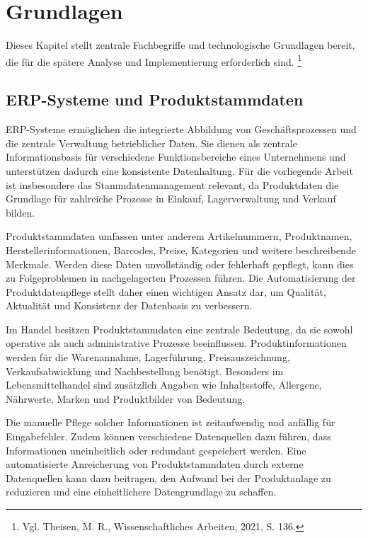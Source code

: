 \documentclass[12pt,a4paper]{article}
\newcommand{\fommanualfootcite}[1]{%
  \footnote{#1}%
}
\begin{document}
\section{Grundlagen}

Dieses Kapitel stellt zentrale Fachbegriffe und technologische Grundlagen bereit, die für die spätere Analyse und Implementierung erforderlich sind.\fommanualfootcite{Vgl. Theisen, M. R., Wissenschaftliches Arbeiten, 2021, S. 136.}

\subsection{ERP-Systeme und Produktstammdaten}

ERP-Systeme ermöglichen die integrierte Abbildung von Geschäftsprozessen und die zentrale Verwaltung betrieblicher Daten. Sie dienen als zentrale Informationsbasis für verschiedene Funktionsbereiche eines Unternehmens und unterstützen dadurch eine konsistente Datenhaltung. Für die vorliegende Arbeit ist insbesondere das Stammdatenmanagement relevant, da Produktdaten die Grundlage für zahlreiche Prozesse in Einkauf, Lagerverwaltung und Verkauf bilden.

Produktstammdaten umfassen unter anderem Artikelnummern, Produktnamen, Herstellerinformationen, Barcodes, Preise, Kategorien und weitere beschreibende Merkmale. Werden diese Daten unvollständig oder fehlerhaft gepflegt, kann dies zu Folgeproblemen in nachgelagerten Prozessen führen. Die Automatisierung der Produktdatenpflege stellt daher einen wichtigen Ansatz dar, um Qualität, Aktualität und Konsistenz der Datenbasis zu verbessern.

Im Handel besitzen Produktstammdaten eine zentrale Bedeutung, da sie sowohl operative als auch administrative Prozesse beeinflussen. Produktinformationen werden für die Warenannahme, Lagerführung, Preisauszeichnung, Verkaufsabwicklung und Nachbestellung benötigt. Besonders im Lebensmittelhandel sind zusätzlich Angaben wie Inhaltsstoffe, Allergene, Nährwerte, Marken und Produktbilder von Bedeutung.

Die manuelle Pflege solcher Informationen ist zeitaufwendig und anfällig für Eingabefehler. Zudem können verschiedene Datenquellen dazu führen, dass Informationen uneinheitlich oder redundant gespeichert werden. Eine automatisierte Anreicherung von Produktstammdaten durch externe Datenquellen kann dazu beitragen, den Aufwand bei der Produktanlage zu reduzieren und eine einheitlichere Datengrundlage zu schaffen.
\end{document}
